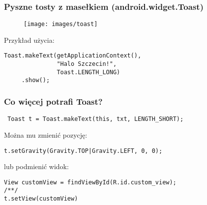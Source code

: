
\begin{frame}[fragile]\frametitle{Pyszne tosty z masełkiem (android.widget.Toast)}

\begin{figure}[h]
 \centering
 \texttt{[image: images/toast]}
\end{figure}

 Przykład użycia: 
 \begin{lstlisting}
Toast.makeText(getApplicationContext(),
               "Halo Szczecin!", 
               Toast.LENGTH_LONG)
     .show();
 \end{lstlisting}

\end{frame}

\begin{frame}[fragile]
\frametitle{Co więcej potrafi Toast?}
\begin{lstlisting}
 Toast t = Toast.makeText(this, txt, LENGTH_SHORT);
\end{lstlisting}

\pause

Można mu zmienić pozycję:
\begin{lstlisting}
t.setGravity(Gravity.TOP|Gravity.LEFT, 0, 0);
\end{lstlisting}

\pause

lub podmienić widok:
\begin{lstlisting}
View customView = findViewById(R.id.custom_view);
/**/
t.setView(customView)
 \end{lstlisting}

\end{frame}

